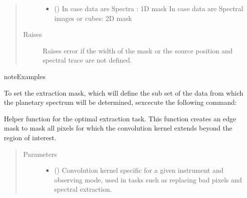 \documentclass[a4paper,10pt,english]{sphinxmanual}
\begin{document}
\begin{fulllineitems}
\begin{fulllineitems}
\begin{quote}
\begin{description}
\begin{itemize}
\item {} 
 () \textendash{} In case data are Spectra : 1D mask
In case data are Spectral images or cubes: 2D mask

\end{itemize}

\item[{Raises}] \leavevmode
{} \textendash{} Raises error if the width of the mask or the source position
and spectral trace are not defined.

\end{description}\end{quote}

\begin{sphinxadmonition}{note}{Examples}

To set the extraction mask, which will define the sub set of the data
from which the planetary spectrum will be determined, sexcecute the
following command:

%
\begin{sphinxVerbatim}[commandchars=\\\{\}]
\end{sphinxVerbatim}
\end{sphinxadmonition}

\end{fulllineitems}


\begin{fulllineitems}
\label{\detokenize{cascade.TSO:cascade.TSO.TSO.TSOSuite._create_edge_mask}}
Helper function for the optimal extraction task. This function
creates an edge mask to mask all pixels for which the convolution
kernel extends beyond the region of interest.
\begin{quote}\begin{description}
\item[{Parameters}] \leavevmode\begin{itemize}
\item {} 
 () \textendash{} Convolution kernel specific for a given instrument and observing
mode, used in tasks such as replacing bad pixels and
spectral extraction.


\end{itemize}
\end{description}
\end{quote}
\end{fulllineitems}
\end{fulllineitems}
\end{document}

